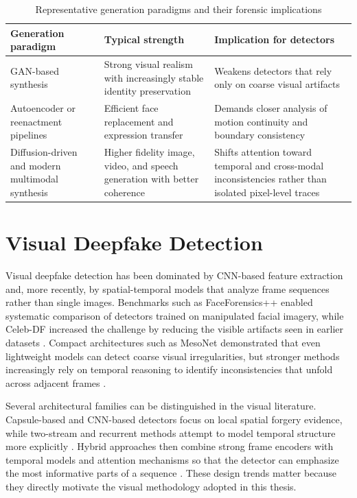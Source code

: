 \begin{table}[H]
\centering
\small
\caption{Representative generation paradigms and their forensic implications}
\label{tab:generation-paradigms}
\begin{tabular}{p{}p{}p{}}
\toprule
\textbf{Generation paradigm} & \textbf{Typical strength} & \textbf{Implication for detectors} \\
\midrule
GAN-based synthesis & Strong visual realism with increasingly stable identity preservation & Weakens detectors that rely only on coarse visual artifacts \cite{kaur2024deepfake,gong2024survey} \\
Autoencoder or reenactment pipelines & Efficient face replacement and expression transfer & Demands closer analysis of motion continuity and boundary consistency \cite{mubarak2023survey} \\
Diffusion-driven and modern multimodal synthesis & Higher fidelity image, video, and speech generation with better coherence & Shifts attention toward temporal and cross-modal inconsistencies rather than isolated pixel-level traces \cite{dissanayake2025review,mubarak2023survey} \\
\bottomrule
\end{tabular}
\end{table}

\section{Visual Deepfake Detection}

Visual deepfake detection has been dominated by CNN-based feature extraction and, more recently, by spatial-temporal models that analyze frame sequences rather than single images. Benchmarks such as FaceForensics++ enabled systematic comparison of detectors trained on manipulated facial imagery, while Celeb-DF increased the challenge by reducing the visible artifacts seen in earlier datasets \cite{roessler2019faceforensicspp,li2020celebdf}. Compact architectures such as MesoNet demonstrated that even lightweight models can detect coarse visual irregularities, but stronger methods increasingly rely on temporal reasoning to identify inconsistencies that unfold across adjacent frames \cite{afchar2018mesonet,guera2018deepfake}.

Several architectural families can be distinguished in the visual literature. Capsule-based and CNN-based detectors focus on local spatial forgery evidence, while two-stream and recurrent methods attempt to model temporal structure more explicitly \cite{nguyen2019capsule,zhou2017two,guera2018deepfake}. Hybrid approaches then combine strong frame encoders with temporal models and attention mechanisms so that the detector can emphasize the most informative parts of a sequence \cite{antad2024hybrid,huang2024spatiotemporal}. These design trends matter because they directly motivate the visual methodology adopted in this thesis.

